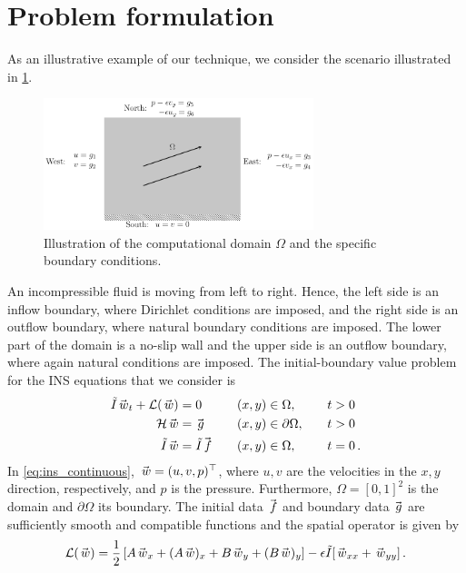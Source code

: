 \section{Problem formulation}\label{sec:continuous}
As an illustrative example of our technique, we consider the scenario illustrated in \cref{fig:domain}. 
\begin{figure}%
  \centering
  \includegraphics[width=0.7\textwidth]{images/domain/domain.pdf}
  \caption{Illustration of the computational domain $\Omega$ and the specific boundary conditions.}%
  \label{fig:domain}
\end{figure}
An incompressible fluid is moving from left to right. Hence, the left side is an inflow boundary, where Dirichlet conditions are imposed, and the right side is an outflow boundary, where natural boundary conditions \cite{papanastasiou1992new} are imposed. The lower part of the domain is a no-slip wall and the upper side is an outflow boundary, where again natural conditions are imposed. The initial-boundary value problem for the INS equations that we consider is
\begin{equation}
\begin{aligned}
  \tilde{I} \w_t  + \eul(\w)	& = 0
	& \quad & (x,y) \in \Omega, & \quad t & > 0
	\\
	\mathcal{H} \w & =  \g & \quad & (x,y) \in \partial\Omega, & \quad t & > 0
	\\
  \tilde{I} \w 	& =  \tilde{I}\f & \quad & (x,y) \in \Omega, & \quad t & = 0
	\, .
\end{aligned} 
\label{eq:ins_continuous}
\end{equation}
In \eqref{eq:ins_continuous}, $\w = (u,v,p)^\top$, where $u,v$ are the velocities in the $x,y$ direction, respectively, and $p$ is the pressure. Furthermore, $\Omega = [0,1]^2$ is the domain and $\partial \Omega$ its boundary. The initial data $\f$ and boundary data $\g$ are sufficiently smooth and compatible functions and the spatial operator is given by \cite{nordstrom2019energy}
\begin{equation}
  \eul(\w) = 
  \frac{1}{2}\left[A \w_x + (A \w)_x + B \w_y + (B \w)_y\right] 
  - \epsilon\tilde{I}[\w_{xx} + \w_{yy}]
  \, .
  \label{eq:eul}
\end{equation}
